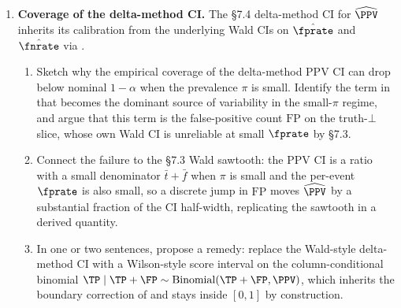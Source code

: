 \begin{enumerate}
\item \exstarstarstar
\label{ex:ch7-10}
\textbf{Coverage of the delta-method CI.}
The §7.4 delta-method CI for $\widehat{\PPV}$ inherits its
calibration from the underlying Wald CIs on $\hat{\fprate}$ and
$\hat{\fnrate}$ via .
\begin{enumerate}
  \item[(a)] Sketch why the empirical coverage of the delta-method
    PPV CI can drop below nominal $1 - \alpha$ when the
    prevalence $\pi$ is small. Identify the term in
     that becomes the dominant source of
    variability in the small-$\pi$ regime, and argue that this
    term is the false-positive count $\mathrm{FP}$ on the
    truth-$\bot$ slice, whose own Wald CI is unreliable at small
    $\fprate$ by §7.3.
  \item[(b)] Connect the failure to the §7.3 Wald sawtooth: the
    PPV CI is a ratio with a small denominator $\bar t + \bar f$
    when $\pi$ is small and the per-event $\fprate$ is also
    small, so a discrete jump in $\mathrm{FP}$ moves
    $\widehat{\PPV}$ by a substantial fraction of the CI
    half-width, replicating the sawtooth in a derived quantity.
  \item[(c)] In one or two sentences, propose a remedy: replace
    the Wald-style delta-method CI with a Wilson-style score
    interval on the column-conditional binomial
    $\TP \mid \TP + \FP \sim \mathrm{Binomial}(\TP + \FP, \PPV)$,
    which inherits the boundary correction of
     and stays inside $[0, 1]$ by
    construction.
\end{enumerate}


\end{enumerate}
